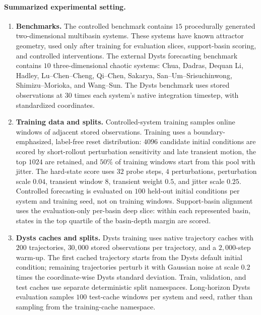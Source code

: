 \paragraph{Summarized experimental setting.}
\begin{enumerate}
  \item \textbf{Benchmarks.} The controlled benchmark contains \(15\) procedurally generated two-dimensional multibasin systems. These systems have known attractor geometry, used only after training for evaluation slices, support-basin scoring, and controlled interventions. The external Dysts forecasting benchmark contains \(10\) three-dimensional chaotic systems: Chua, Dadras, Dequan Li, Hadley, Lu--Chen--Cheng, Qi--Chen, Sakarya, San--Um--Srisuchinwong, Shimizu--Morioka, and Wang--Sun. The Dysts benchmark uses stored observations at \(30\) times each system's native integration timestep, with standardized coordinates.

  \item \textbf{Training data and splits.} Controlled-system training samples online windows of adjacent stored observations. Training uses a boundary-emphasized, label-free reset distribution: \(4096\) candidate initial conditions are scored by short-rollout perturbation sensitivity and late transient motion, the top \(1024\) are retained, and \(50\%\) of training windows start from this pool with jitter. The hard-state score uses \(32\) probe steps, \(4\) perturbations, perturbation scale \(0.04\), transient window \(8\), transient weight \(0.5\), and jitter scale \(0.25\). Controlled forecasting is evaluated on \(100\) held-out initial conditions per system and training seed, not on training windows. Support-basin alignment uses the evaluation-only per-basin deep slice: within each represented basin, states in the top quartile of the basin-depth margin are scored.

  \item \textbf{Dysts caches and splits.} Dysts training uses native trajectory caches with \(200\) trajectories, \(30{,}000\) stored observations per trajectory, and a \(2{,}000\)-step warm-up. The first cached trajectory starts from the Dysts default initial condition; remaining trajectories perturb it with Gaussian noise at scale \(0.2\) times the coordinate-wise Dysts standard deviation. Train, validation, and test caches use separate deterministic split namespaces. Long-horizon Dysts evaluation samples \(100\) test-cache windows per system and seed, rather than sampling from the training-cache namespace.


\end{enumerate}
